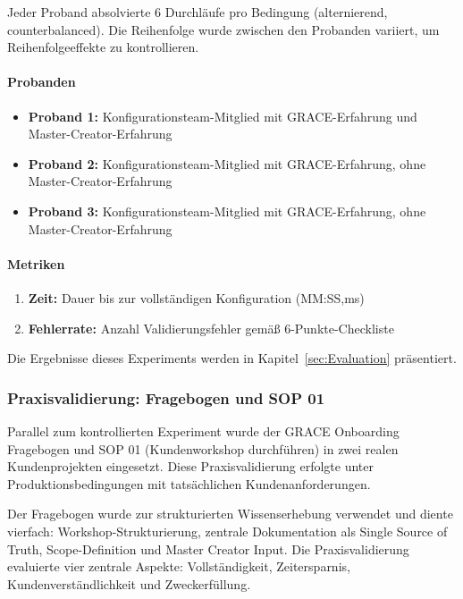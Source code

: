 Jeder Proband absolvierte 6 Durchläufe pro Bedingung (alternierend, counterbalanced). Die Reihenfolge wurde zwischen den Probanden variiert, um Reihenfolgeeffekte zu kontrollieren.

\paragraph{Probanden}
\begin{itemize}
    \item \textbf{Proband 1:} Konfigurationsteam-Mitglied mit GRACE-Erfahrung und Master-Creator-Erfahrung
    \item \textbf{Proband 2:} Konfigurationsteam-Mitglied mit GRACE-Erfahrung, ohne Master-Creator-Erfahrung
    \item \textbf{Proband 3:} Konfigurationsteam-Mitglied mit GRACE-Erfahrung, ohne Master-Creator-Erfahrung
\end{itemize}

\paragraph{Metriken}
\begin{enumerate}
    \item \textbf{Zeit:} Dauer bis zur vollständigen Konfiguration (MM:SS,ms)
    \item \textbf{Fehlerrate:} Anzahl Validierungsfehler gemäß 6-Punkte-Checkliste
\end{enumerate}

Die Ergebnisse dieses Experiments werden in Kapitel~\ref{sec:Evaluation} präsentiert.

\subsubsection{Praxisvalidierung: Fragebogen und SOP 01}
\label{subsubsec:PraxisvalidierungFragebogen}

Parallel zum kontrollierten Experiment wurde der GRACE Onboarding Fragebogen und SOP 01 (Kundenworkshop durchführen) in zwei realen Kundenprojekten eingesetzt. Diese Praxisvalidierung erfolgte unter Produktionsbedingungen mit tatsächlichen Kundenanforderungen.

Der Fragebogen wurde zur strukturierten Wissenserhebung verwendet und diente vierfach: Workshop-Strukturierung, zentrale Dokumentation als Single Source of Truth, Scope-Definition und Master Creator Input. Die Praxisvalidierung evaluierte vier zentrale Aspekte: Vollständigkeit, Zeitersparnis, Kundenverständlichkeit und Zweckerfüllung.

